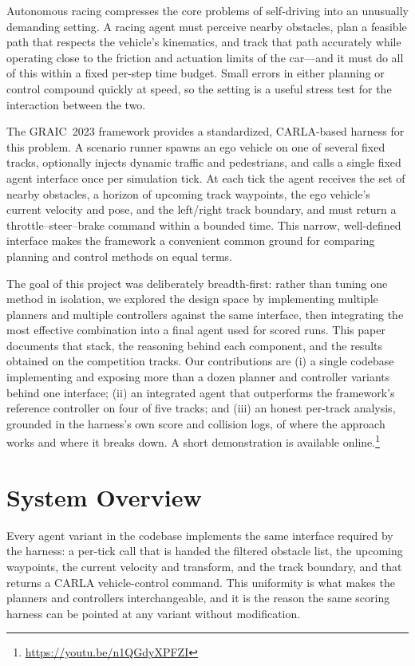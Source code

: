\documentclass[conference]{IEEEtran}
\begin{document}
Autonomous racing compresses the core problems of self-driving into an
unusually demanding setting. A racing agent must perceive nearby obstacles,
plan a feasible path that respects the vehicle's kinematics, and track that
path accurately while operating close to the friction and actuation limits of
the car---and it must do all of this within a fixed per-step time budget. Small
errors in either planning or control compound quickly at speed, so the setting
is a useful stress test for the interaction between the two.

The GRAIC~2023 framework provides a standardized, CARLA-based harness for this
problem. A scenario runner spawns an ego vehicle on one of several fixed
tracks, optionally injects dynamic traffic and pedestrians, and calls a single
fixed agent interface once per simulation tick. At each tick the agent receives
the set of nearby obstacles, a horizon of upcoming track waypoints, the ego
vehicle's current velocity and pose, and the left/right track boundary, and
must return a throttle--steer--brake command within a bounded time. This narrow,
well-defined interface makes the framework a convenient common ground for
comparing planning and control methods on equal terms.

The goal of this project was deliberately breadth-first: rather than tuning one
method in isolation, we explored the design space by implementing multiple
planners and multiple controllers against the same interface, then integrating
the most effective combination into a final agent used for scored runs. This
paper documents that stack, the reasoning behind each component, and the
results obtained on the competition tracks. Our contributions are (i) a single
codebase implementing and exposing more than a dozen planner and controller
variants behind one interface; (ii) an integrated agent that outperforms the
framework's reference controller on four of five tracks; and (iii) an honest
per-track analysis, grounded in the harness's own score and collision logs, of
where the approach works and where it breaks down. A short demonstration is
available online.\footnote{\url{https://youtu.be/n1QGdyXPFZI}}

\section{System Overview}

Every agent variant in the codebase implements the same interface required by
the harness: a per-tick call that is handed the filtered obstacle list, the
upcoming waypoints, the current velocity and transform, and the track boundary,
and that returns a CARLA vehicle-control command. This uniformity is what makes
the planners and controllers interchangeable, and it is the reason the same
scoring harness can be pointed at any variant without modification.
\end{document}
